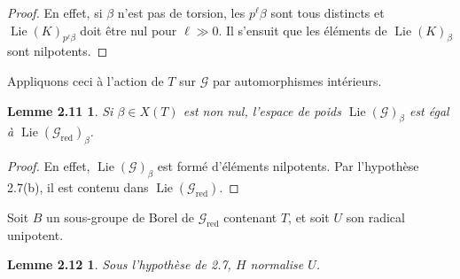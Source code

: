\documentclass[11pt]{article}
\newcommand{\Lie}{\operatorname{Lie}}
\newcommand{\red}{\mathrm{red}}
\newtheorem*{lemme211}{Lemme 2.11}
\newtheorem*{lemme212}{Lemme 2.12}
\begin{document}
\begin{proof}
En effet, si \(\beta\) n'est pas de torsion, les \(p^\ell\beta\) sont tous distincts et
\(\Lie(K)_{p^\ell\beta}\) doit être nul pour \(\ell\gg0\). Il s'ensuit que les éléments
de \(\Lie(K)_\beta\) sont nilpotents.
\end{proof}

Appliquons ceci à l'action de \(T\) sur \(\mathcal G\) par automorphismes intérieurs.

\begin{lemme211}
Si \(\beta\in X(T)\) est non nul, l'espace de poids \(\Lie(\mathcal G)_\beta\) est égal
à \(\Lie(\mathcal G_{\red})_\beta\).
\end{lemme211}

\begin{proof}
En effet, \(\Lie(\mathcal G)_\beta\) est formé d'éléments nilpotents. Par l'hypothèse
2.7(b), il est contenu dans \(\Lie(\mathcal G_{\red})\).
\end{proof}

Soit \(B\) un sous-groupe de Borel de \(\mathcal G_{\red}\) contenant \(T\), et soit
\(U\) son radical unipotent.

\begin{lemme212}
Sous l'hypothèse de 2.7, \(H\) normalise \(U\).
\end{lemme212}
\end{document}
